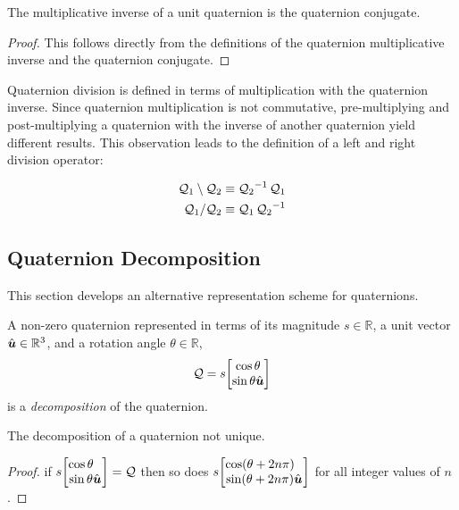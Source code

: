 \begin{corollary}\label{thm:quat_unit_inverse_is_conjugate}
The multiplicative inverse of a unit quaternion is the quaternion conjugate.
\end{corollary}
\begin{proof}
This follows directly from the definitions of the quaternion multiplicative
inverse and the quaternion conjugate.
\end{proof}

Quaternion division is defined in terms of multiplication with the quaternion
inverse.
Since quaternion multiplication is not commutative,
pre-multiplying and post-multiplying a quaternion
with the inverse of another quaternion yield different results.
This observation leads to the definition of a left and right division operator:
\begin{definition}\label{def:quat_div}
\begin{align}
  \quat Q_1 \setminus \quat Q_2 &\equiv \QxQ{{\quat Q_2}^{-1}} {\quat Q_1} \\
  \quat Q_1 / \quat Q_2 &\equiv \QxQ{\quat Q_1} {{\quat Q_2}^{-1}}
\end{align}
\end{definition}

\subsection{Quaternion Decomposition}\label{sec:app_decomp}

This section develops an alternative representation scheme for quaternions.
\begin{definition}\label{def:quat_decomp}
A non-zero quaternion represented in terms of
its magnitude $s\in\mathbb R$,
a unit vector $\hat{\boldsymbol{u}}\in\mathbb R^3$,
and a rotation angle $\theta\in\mathbb R$,
\begin{equation}
  \quat Q = s\quatsv{\cos\theta}{\sin\theta\vhat u}\label{eqn:quat_decomp_def}
\end{equation}
is a \emph{decomposition} of the quaternion.
\end{definition}

\begin{corollary}\label{thm:quat_decomp_multivalued}
The decomposition of a quaternion not unique.
\end{corollary}
\begin{proof}
if $s\quatsv{\cos\theta\phantom{\vhat u}}{\sin\theta \vhat u} = \quat Q$
then so does
$s\quatsv{\cos(\theta+2n\pi)\phantom{\vhat u}}{\sin(\theta+2n\pi) \vhat u}$
for all integer values of $n$.
\end{proof}

